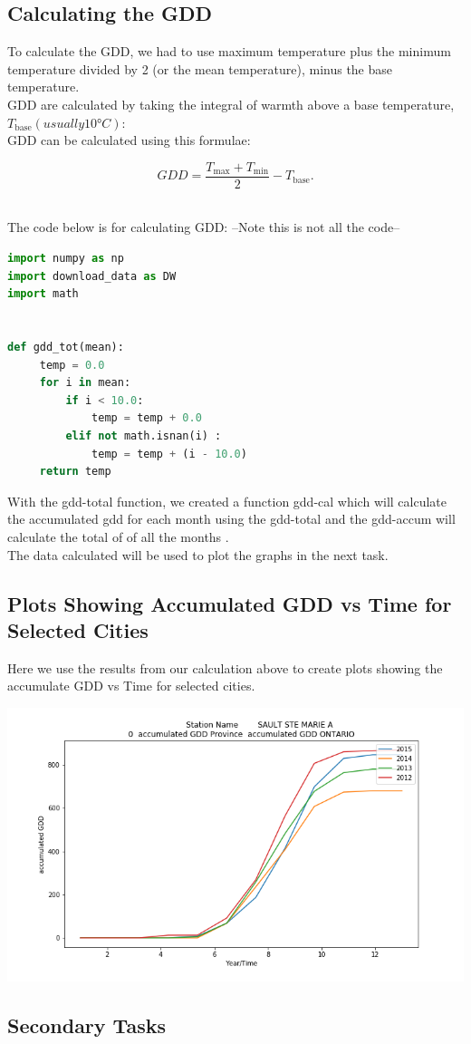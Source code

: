 \subsection{Calculating the GDD}

To calculate the GDD, we had to use maximum temperature plus the minimum temperature divided by 2 (or the mean temperature), minus the base temperature.\\
GDD are calculated by taking the integral of warmth above a base temperature, $T_{{\mathrm  {base}}} (usually 10 °C):$\\
GDD can be calculated using this formulae:

$$GDD={\frac  {T_{{\mathrm  {max}}}+T_{{\mathrm  {min}}}}{2}}-T_{{\mathrm  {base}}}. $$\

The code below is for calculating GDD:
--Note this is not all the code--

\begin{lstlisting}[language=Python]
import numpy as np
import download_data as DW
import math


def gdd_tot(mean):
     temp = 0.0
     for i in mean:
         if i < 10.0:
             temp = temp + 0.0
         elif not math.isnan(i) :
             temp = temp + (i - 10.0)
     return temp

\end{lstlisting}
With the gdd-total function, we created a function gdd-cal which will calculate the accumulated gdd for each month using the gdd-total and the gdd-accum will calculate the total of of all the months  .\\
The data calculated will be used to plot the graphs in the next task.
  
\subsection{Plots Showing Accumulated GDD vs Time for\\ Selected Cities}

Here we use the results from our calculation above to create plots showing the accumulate GDD vs Time for selected cities. 

\includegraphics[scale=0.35]{Fig_GDD_50092.png}\\
  

\subsection{Secondary Tasks}




